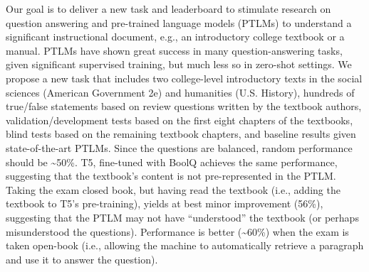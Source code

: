 Our goal is to deliver a new task and leaderboard to stimulate research on question answering and pre-trained language models (PTLMs) to understand a significant instructional document, e.g., an introductory college textbook or a manual. PTLMs have shown great success in many question-answering tasks, given significant supervised training, but much less so in zero-shot settings. We propose a new task that includes two college-level introductory texts in the social sciences (American Government 2e) and humanities (U.S. History), hundreds of true/false statements based on review questions written by the textbook authors, validation/development tests based on the first eight chapters of the textbooks, blind tests based on the remaining textbook chapters, and baseline results given state-of-the-art PTLMs. Since the questions are balanced, random performance should be {\textasciitilde}50\%. T5, fine-tuned with BoolQ achieves the same performance, suggesting that the textbook's content is not pre-represented in the PTLM. Taking the exam closed book, but having read the textbook (i.e., adding the textbook to T5's pre-training), yields at best minor improvement (56\%), suggesting that the PTLM may not have ``understood'' the textbook (or perhaps misunderstood the questions). Performance is better ({\textasciitilde}60\%) when the exam is taken open-book (i.e., allowing the machine to automatically retrieve a paragraph and use it to answer the question).
